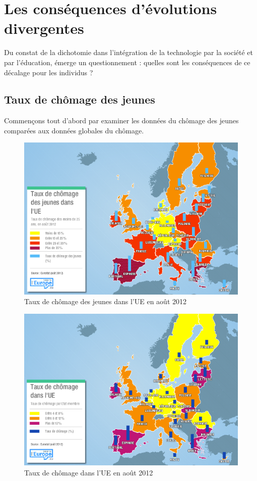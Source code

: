 
\chapter{Les conséquences d'évolutions divergentes}
Du constat de la dichotomie dans l'intégration de la technologie par la société et par l'éducation, émerge un questionnement : quelles sont les conséquences de ce décalage pour les individus ?


\section{Taux de chômage des jeunes}
Commençons tout d'abord par examiner les données du chômage des jeunes comparées aux données globales du chômage.
\begin{figure}[H]
\centering
\includegraphics[width=0.92\linewidth]{figures/chom_jeunes}
\caption{Taux de chômage des jeunes dans l'UE en août 2012 \cite{chom_jeunes}}
\end{figure}

\begin{figure}[H]
\centering
\includegraphics[width=0.92\linewidth]{figures/chom}
\caption{Taux de chômage dans l'UE en août 2012 \cite{chom}}
\end{figure}

